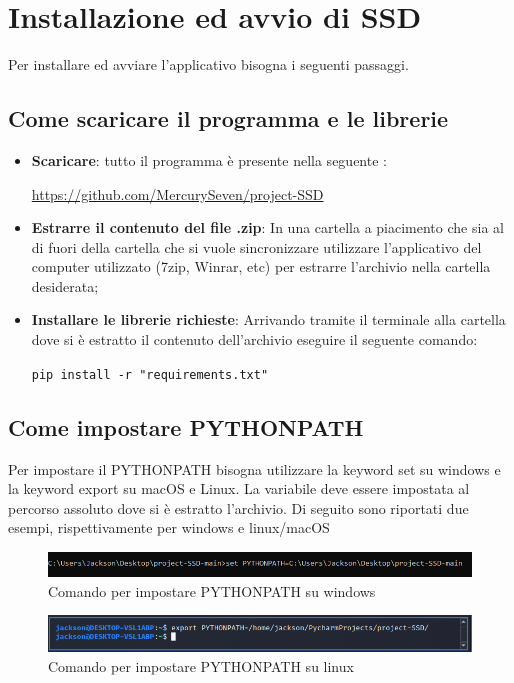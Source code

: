 \section{Installazione ed avvio di SSD}
Per installare ed avviare l'applicativo  bisogna i seguenti passaggi.
\subsection{Come scaricare il programma e le librerie}

\begin{itemize}
	\item \textbf{Scaricare}: tutto il programma è presente nella seguente :\newline{}
\centerline{\url{https://github.com/MercurySeven/project-SSD}}

	\item \textbf{Estrarre il contenuto del file .zip}: In una cartella a piacimento che sia al di fuori della cartella che si vuole sincronizzare utilizzare l'applicativo del computer utilizzato (7zip, Winrar, etc) per estrarre l'archivio nella cartella desiderata;
	\item \textbf{Installare le librerie richieste}:
	Arrivando tramite il terminale alla cartella dove si è estratto il contenuto dell'archivio eseguire il seguente comando:\newline{}
	\centerline{\texttt{pip install -r "requirements.txt"}}
\end{itemize}
\subsection{Come impostare PYTHONPATH}
Per impostare il PYTHONPATH bisogna utilizzare la keyword set su windows e la keyword export su macOS e Linux. La variabile deve essere impostata al percorso assoluto dove si è estratto l'archivio.
Di seguito sono riportati due esempi, rispettivamente per windows e linux/macOS
\begin{figure}[H]
    \centering
    \includegraphics[scale = 0.65]{components/img/Windows-istruzione-1.png}
    \caption{Comando per impostare PYTHONPATH su windows}
    \label{fig:comando per impostare PYTHONPATH su windows}
\end{figure}
\begin{figure}[H]
    \centering
    \includegraphics[scale = 0.50]{components/img/linux-istruzione-1.jpg}
    \caption{ Comando per impostare PYTHONPATH su linux}
    \label{fig:comando per impostare PYTHONPATH su windows}
\end{figure}
